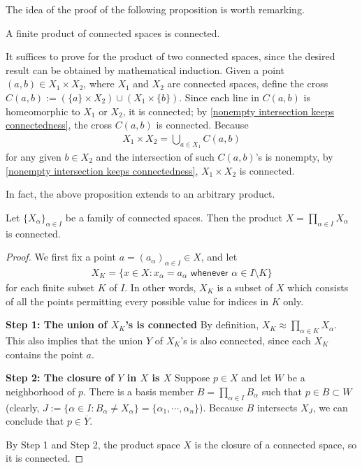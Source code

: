 The idea of the proof of the following proposition is worth remarking.
\begin{prop}
    A finite product of connected spaces is connected.
\end{prop}
\begin{sol}
    It suffices to prove for the product of two connected spaces, since the desired result can be obtained by mathematical induction.
    Given a point $(a, b)\in X_1\times X_2$, where $X_1$ and $X_2$ are connected spaces, define the cross $C(a, b):=(\{a\}\times X_2)\cup(X_1\times\{b\})$.
    Since each line in $C(a, b)$ is homeomorphic to $X_1$ or $X_2$, it is connected; by \cref{nonempty intersection keeps connectedness}, the cross $C(a, b)$ is connected.
    Because
    \begin{align*}
        X_1\times X_2=\bigcup_{a\in X_1}C(a, b)
    \end{align*}
    for any given $b\in X_2$ and the intersection of such $C(a, b)$'s is nonempty, by \cref{nonempty intersection keeps connectedness}, $X_1\times X_2$ is connected.
\end{sol}

In fact, the above proposition extends to an arbitrary product.
\begin{prop}
    Let $\{X_\alpha\}_{\alpha\in I}$ be a family of connected spaces.
    Then the product $X=\prod_{\alpha\in I}X_\alpha$ is connected.
\end{prop}
\begin{proof}
    We first fix a point $a=(a_\alpha)_{\alpha\in I}\in X$, and let
    \begin{align*}
        X_K=\{x\in X
        :
        x_\alpha=a_\alpha\textsf{ whenever }\alpha\in I\setminus K
        \}
    \end{align*}
    for each finite subset $K$ of $I$.
    In other words, $X_K$ is a subset of $X$ which consists of all the points permitting every possible value for indices in $K$ only.

    \textbf{Step 1: The union of $X_K$'s is connected}\newline\indent
    By definition, $X_K\approx\prod_{\alpha\in K}X_\alpha$.
    This also implies that the union $Y$ of $X_K$'s is also connected, since each $X_K$ contains the point $a$.

    \textbf{Step 2: The closure of $Y$ in $X$ is $X$}\newline\indent
    Suppose $p\in X$ and let $W$ be a neighborhood of $p$.
    There is a basis member $B=\prod_{\alpha\in I} B_\alpha$ such that $p\in B\subset W$ (clearly, $J:=\{\alpha\in I: B_\alpha\neq X_\alpha\}=\{\alpha_1, \cdots, \alpha_n\}$).
    Because $B$ intersects $X_J$, we can conclude that $p\in\overline{Y}$.

    By Step 1 and Step 2, the product space $X$ is the closure of a connected space, so it is connected.
\end{proof}

